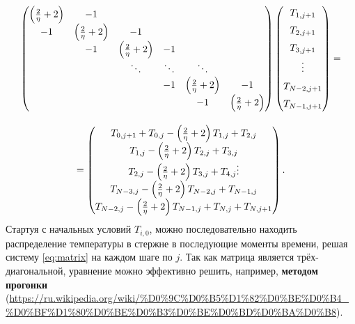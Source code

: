 \documentclass[12pt]{article}
\begin{document}
\begin{equation}
\begin{array}{c}
\begin{pmatrix}
\left(\frac{2}{\eta}+2\right) & -1 & \hphantom{1} & \hphantom{1} & \hphantom{1} & \hphantom{1}\\
-1 & \left(\frac{2}{\eta}+2\right) & -1 & \hphantom{1} & \hphantom{1} & \hphantom{1}\\
\hphantom{1} & -1 & \left(\frac{2}{\eta}+2\right) & -1 & \hphantom{1} & \hphantom{1}\\
\hphantom{1} & \hphantom{1} & \ddots & \ddots & \ddots & \hphantom{1}\\
\hphantom{1} & \hphantom{1} & \hphantom{1} & -1 & \left(\frac{2}{\eta}+2\right) & -1\\
\hphantom{1} & \hphantom{1} & \hphantom{1} & \hphantom{1} & -1 & \left(\frac{2}{\eta}+2\right)\\
\end{pmatrix}
\begin{pmatrix}
\vphantom{\left(\frac{2}{\eta}\right)} T_{1,j+1}\\
\vphantom{\left(\frac{2}{\eta}\right)} T_{2,j+1}\\
\vphantom{\left(\frac{2}{\eta}\right)} T_{3,j+1}\\
\vphantom{\left(\frac{2}{\eta}\right)} \vdots\\
\vphantom{\left(\frac{2}{\eta}\right)} T_{N-2,j+1}\\
\vphantom{\left(\frac{2}{\eta}\right)} T_{N-1,j+1}
\end{pmatrix}=\\
\hphantom{1111}\\
=\begin{pmatrix}
T_{0,j+1}+T_{0,j}-\left(\frac{2}{\eta}+2\right)T_{1,j}+T_{2,j}\\
T_{1,j}-\left(\frac{2}{\eta}+2\right)T_{2,j}+T_{3,j}\\
T_{2,j}-\left(\frac{2}{\eta}+2\right)T_{3,j}+T_{4,j}
\vphantom{\left(\frac{2}{\eta}\right)} \vdots\\
T_{N-3,j}-\left(\frac{2}{\eta}+2\right)T_{N-2,j}+T_{N-1,j}\\
T_{N-2,j}-\left(\frac{2}{\eta}+2\right)T_{N-1,j}+T_{N,j}+T_{N,j+1}
\end{pmatrix}.
\end{array}
\label{eq:matrix}
\end{equation}
%
Стартуя с начальных условий $T_{i,0}$, можно последовательно находить распределение температуры в стержне в последующие моменты времени, решая систему \eqref{eq:matrix} на каждом шаге по $j$. Так как матрица является трёх-диагональной, уравнение можно эффективно решить, например, \textbf{методом прогонки} (\url{https://ru.wikipedia.org/wiki/%D0%9C%D0%B5%D1%82%D0%BE%D0%B4_%D0%BF%D1%80%D0%BE%D0%B3%D0%BE%D0%BD%D0%BA%D0%B8}).
\end{document}

